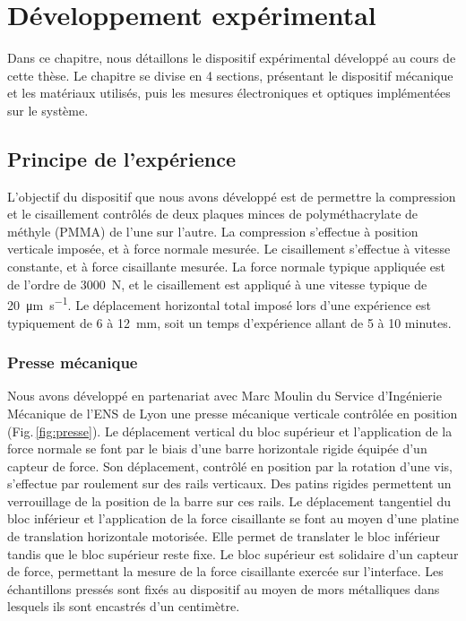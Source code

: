 \chapter{Développement expérimental}
\label{sec:chapxp}
\vspace*{-1cm}
Dans ce chapitre, nous détaillons le dispositif expérimental développé au cours de cette thèse. Le chapitre se divise en 4 sections, présentant le dispositif mécanique et les matériaux utilisés, puis les mesures électroniques et optiques implémentées sur le système.


\minitoc
\newpage

\section{Principe de l'expérience}
\label{sec:grossepresse}
\vspace{.5cm}

L'objectif du dispositif que nous avons développé est de permettre la compression et le cisaillement contrôlés de deux plaques minces de polyméthacrylate de méthyle (PMMA) de  l'une sur l'autre. La compression s'effectue à position verticale imposée, et à force normale mesurée. Le cisaillement s'effectue à vitesse constante, et à force cisaillante mesurée. La force normale typique appliquée est de l'ordre de \SI{3000}{\N}, et le cisaillement est appliqué à une vitesse typique de \SI{20}{\micro\metre\per\second}. Le déplacement horizontal total imposé lors d'une expérience est typiquement de 6 à \SI{12}{\mm}, soit un temps d'expérience allant de 5 à 10 minutes.


\subsection{Presse mécanique}

Nous avons développé en partenariat avec Marc Moulin du Service d'Ingénierie Mécanique de l'ENS de Lyon une presse mécanique verticale contrôlée en position (Fig.\,\ref{fig:presse}).
Le déplacement vertical du bloc supérieur et l'application de la force normale se font par le biais d'une barre horizontale rigide équipée d'un capteur de force. Son déplacement, contrôlé en position par la rotation d'une vis, s'effectue par roulement sur des rails verticaux. Des patins rigides permettent un verrouillage de la position de la barre sur ces rails. Le déplacement tangentiel du bloc inférieur et l'application de la force cisaillante se font au moyen d'une platine de translation horizontale motorisée. Elle permet de translater le bloc inférieur tandis que le bloc supérieur reste fixe. Le bloc supérieur est
solidaire d'un capteur de force, permettant la mesure de la force cisaillante exercée sur l'interface. Les échantillons pressés sont fixés au dispositif au moyen de mors métalliques dans lesquels ils sont encastrés d'un centimètre.

